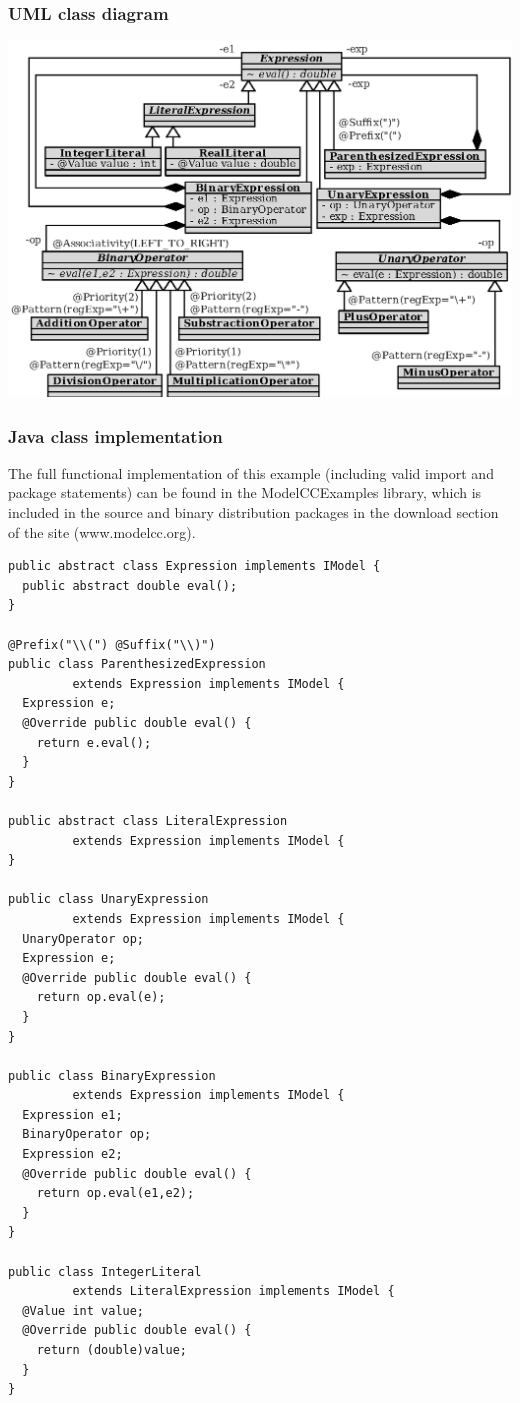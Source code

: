 \documentclass[a4paper,twoside,onecolumn]{article}
\newenvironment{colframe}{%
  \begin{Sbox} 
    \begin{minipage}{.8\columnwidth} 
}{%

  \end{minipage} 
  \end{Sbox} 
  \begin{center} 
    \fcolorbox{black}{MyGray}{\TheSbox} 
  \end{center} 
}
\begin{document}
\subsubsection{UML class diagram}

\includegraphics[width=1.00\textwidth]{calculator2.eps}\\[-1.5cm]

\subsubsection{Java class implementation}
The full functional implementation of this example (including valid import and package statements) can be found in the ModelCCExamples library, which is included in the source and binary distribution packages in the download section of the site (www.modelcc.org).

\begin{colframe}
\begin{verbatim}
public abstract class Expression implements IModel {
  public abstract double eval();
}

@Prefix("\\(") @Suffix("\\)")
public class ParenthesizedExpression
         extends Expression implements IModel {
  Expression e;
  @Override public double eval() {
    return e.eval();
  }
}

public abstract class LiteralExpression
         extends Expression implements IModel {
}

public class UnaryExpression
         extends Expression implements IModel {
  UnaryOperator op;
  Expression e;
  @Override public double eval() {
    return op.eval(e);
  }
}

public class BinaryExpression
         extends Expression implements IModel {
  Expression e1;
  BinaryOperator op;
  Expression e2;
  @Override public double eval() {
    return op.eval(e1,e2);
  }
}

public class IntegerLiteral
         extends LiteralExpression implements IModel {
  @Value int value;
  @Override public double eval() {
    return (double)value;
  }
}
\end{verbatim}
\end{colframe}
\end{document}
